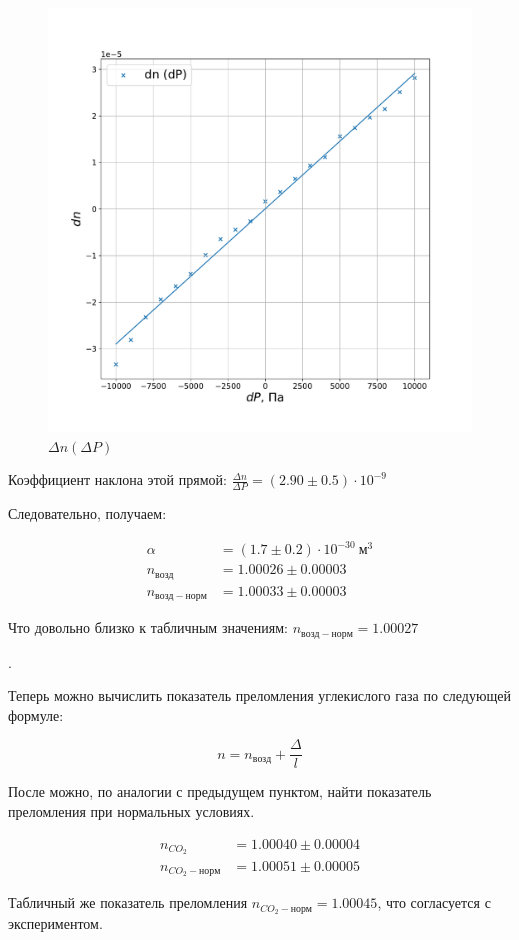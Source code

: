 \documentclass[a4paper, 12pt]{article}
\newcounter{Points}
\newcommand{\point}{\arabic{Points}. \addtocounter{Points}{1}}
\begin{document}
\begin{figure}[!h]
    \includegraphics[scale = 0.5]{press}
    \centering
    \caption{$\Delta n (\Delta P)$}
    \label{img:press}
\end{figure}

Коэффициент наклона этой прямой: $\frac{\Delta n}{\Delta P} = (2.90 \pm 0.5) \cdot 10^{-9}$

Следовательно, получаем:

\begin{align*}
    \alpha &= (1.7 \pm 0.2) \cdot 10^{-30} ~м^3 \\
    n_{возд} &= 1.00026 \pm 0.00003 \\
    n_{возд-норм} &= 1.00033 \pm 0.00003 
\end{align*}

Что довольно близко к табличным значениям: $n_{возд-норм} = 1.00027$

\point Теперь можно вычислить показатель преломления углекислого газа по следующей формуле:

\[
    n = n_{возд} + \frac{\Delta}{l}
\]

После можно, по аналогии с предыдущем пунктом, найти показатель преломления при нормальных условиях.

\begin{align*}
    n_{CO_2} &= 1.00040 \pm 0.00004 \\
    n_{CO_2-норм} &= 1.00051 \pm 0.00005 
\end{align*}

Табличный же показатель преломления $n_{CO_2-норм} = 1.00045$, что согласуется с экспериментом.
\end{document}
